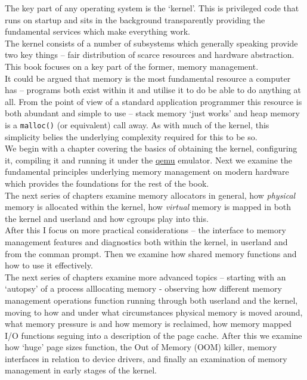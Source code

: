 The key part of any operating system is the `kernel'. This is privileged code
that runs on startup and sits in the background transparently providing the
fundamental services which make everything work.\\

The kernel consists of a number of subsystems which generally speaking provide
two key things -- fair distribution of scarce resources and hardware
abstraction. This book focuses on a key part of the former, memory management.\\

It could be argued that memory is the most fundamental resource a computer has
-- programs both exist within it and utilise it to do be able to do anything at
all. From the point of view of a standard application programmer this resource
is both abundant and simple to use -- stack memory `just works' and
heap memory is a \texttt{malloc()} (or equivalent) call away. As with
much of the kernel, this simplicity belies the underlying complexity required
for this to be so.\\

We begin with a chapter covering the basics of obtaining the kernel, configuring
it, compiling it and running it under the \href{https://www.qemu.org/}{qemu}
emulator. Next we examine the fundamental principles underlying memory
management on modern hardware which provides the foundations for the rest of the
book.\\

The next series of chapters examine memory allocators in general,
how \emph{physical} memory is allocated within the kernel, how \emph{virtual}
memory is mapped in both the kernel and userland and how cgroups play into this.\\

After this I focus on more practical considerations -- the interface to memory
management features and diagnostics both within the kernel, in userland and from
the comman prompt. Then we examine how shared memory functions and how to use it
effectively.\\

The next series of chapters examine more advanced topics -- starting with an
`autopsy' of a process alllocating memory - observing how different memory
management operations function running through both userland and the kernel,
moving to how and under what circumstances physical memory is moved around, what
memory pressure is and how memory is reclaimed, how memory mapped I/O functions
seguing into a description of the page cache. After this we examine how `huge'
page sizes function, the Out of Memory (OOM) killer, memory interfaces in
relation to device drivers, and finally an examination of memory management in
early stages of the kernel.\\

